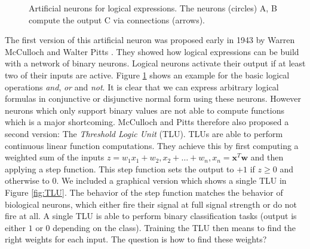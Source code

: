 \begin{figure}[ht]
\begin{center}
{\begin{tabular}{cccc}
  \end{tabular}
  }%
  \end{center}
  \caption[Artificial Neurons for Logical Expressions]{Artificial neurons for logical expressions. The neurons (circles) A, B compute the output C via connections (arrows).}
  \label{fig:ArtificialNeuron}
\end{figure}

The first version of this artificial neuron was proposed early in 1943 by Warren McCulloch and Walter Pitts \cite{mcculloch1943logical}. They showed how logical expressions can be build with a network of binary neurons. Logical neurons activate their output if at least two of their inputs are active. Figure \ref{fig:ArtificialNeuron} shows an example for the basic logical operations \textit{and}, \textit{or} and \textit{not}. It is clear that we can express arbitrary logical formulas in conjunctive or disjunctive normal form using these neurons. However neurons which only support binary values are not able to compute functions which is a major shortcoming. McCulloch and Pitts therefore also proposed a second version: The \textit{Threshold Logic Unit} (TLU). TLUs are able to perform continuous linear function computations. They achieve this by first computing a weighted sum of the inputs $z = w_1x_1 + w_2, x_2 + \dots + w_n, x_n = \mathbf{x}^T\mathbf{w}$ and then applying a step function. This step function sets the output to $+1$ if $z\geq0$ and otherwise to $0$. We included a graphical version which shows a single TLU in Figure \ref{fig:TLU}. The behavior of the step function matches the behavior of biological neurons, which either fire their signal at full signal strength or do not fire at all. A single TLU is able to perform binary classification tasks (output is either $1$ or $0$ depending on the class). Training the TLU then means to find the right weights for each input. The question is how to find these weights?

